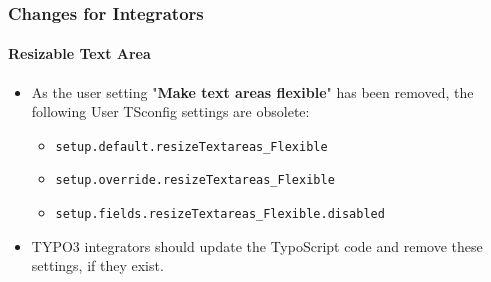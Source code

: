 %

\begin{frame}[fragile]
	\frametitle{Changes for Integrators}
	\framesubtitle{Resizable Text Area}

	\begin{itemize}
		\item As the user setting "\textbf{Make text areas flexible}" has been removed,
			the following User TSconfig settings are obsolete:

			\begin{itemize}
				\item \texttt{setup.default.resizeTextareas\_Flexible}
				\item \texttt{setup.override.resizeTextareas\_Flexible}
				\item \texttt{setup.fields.resizeTextareas\_Flexible.disabled}
			\end{itemize}

		\item TYPO3 integrators should update the TypoScript code and remove these
			settings, if they exist.

	\end{itemize}
\end{frame}

